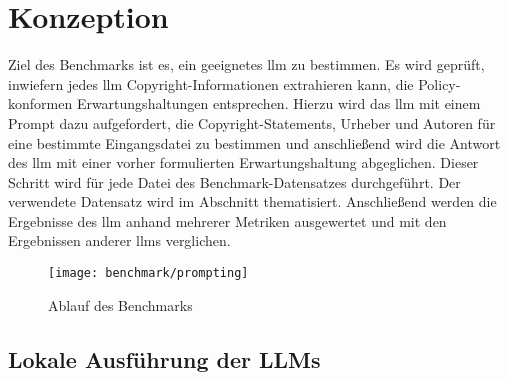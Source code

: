 
\section{Konzeption}\label{sec:konzeption-benchmark}

Ziel des Benchmarks ist es, ein geeignetes \gls{llm} zu bestimmen.
Es wird geprüft, inwiefern jedes \gls{llm} Copyright-Informationen extrahieren kann, die Policy-konformen Erwartungshaltungen entsprechen.
Hierzu wird das \gls{llm} mit einem Prompt dazu aufgefordert, die Copyright-Statements, Urheber und Autoren für eine bestimmte Eingangsdatei zu bestimmen und anschließend wird die Antwort des \gls{llm} mit einer vorher formulierten Erwartungshaltung abgeglichen.
Dieser Schritt wird für jede Datei des Benchmark-Datensatzes durchgeführt.
Der verwendete Datensatz wird im Abschnitt  thematisiert.
Anschließend werden die Ergebnisse des \gls{llm} anhand mehrerer Metriken ausgewertet und mit den Ergebnissen anderer \glspl{llm} verglichen.

\begin{figure}[ht]
    \centering
    \texttt{[image: benchmark/prompting]}
    \caption{Ablauf des Benchmarks}
    \label{fig:prompting_setup}
\end{figure}


\subsection{Lokale Ausführung der LLMs}\label{subsec:lokale-ausfuehrung}

